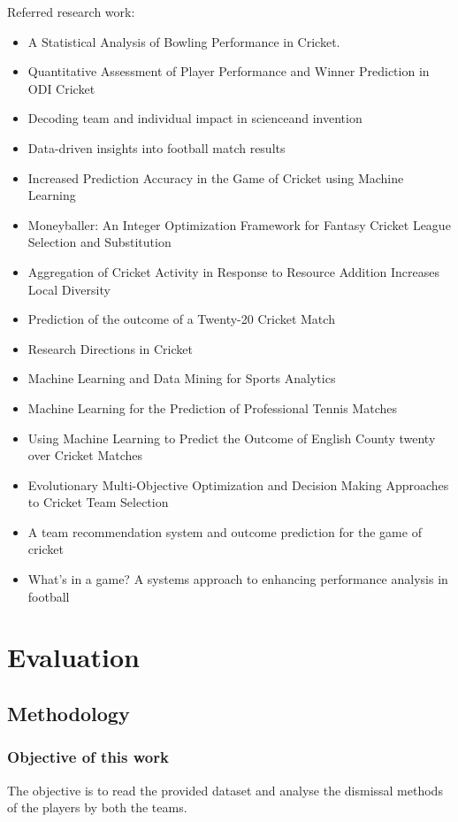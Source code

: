 \documentclass[fleqn,10pt]{wlscirep}
\begin{document}
Referred research work:
\begin{itemize}
    \item A Statistical Analysis of Bowling Performance in Cricket.
    \item Quantitative Assessment of Player Performance and Winner Prediction
    in ODI Cricket
    \item Decoding team and individual impact in scienceand invention
    \item Data-driven insights into football match results
    \item Increased Prediction Accuracy in the Game of Cricket using Machine Learning
    \item Moneyballer: An Integer Optimization Framework for Fantasy Cricket League Selection and Substitution
    \item Aggregation of Cricket Activity in Response to Resource Addition Increases Local Diversity
    \item Prediction of the outcome of a Twenty-20 Cricket Match
    \item Research Directions in Cricket
    \item Machine Learning and Data Mining for Sports Analytics
    \item Machine Learning for the Prediction of Professional Tennis Matches
    \item Using Machine Learning to Predict the Outcome of English County twenty over Cricket Matches
    \item Evolutionary Multi-Objective Optimization and Decision Making Approaches to Cricket Team Selection
    \item A team recommendation system and outcome prediction for the game of cricket
    \item What’s in a game? A systems approach to enhancing performance analysis in football
\end{itemize}

\section{Evaluation}
\subsection{Methodology}
\subsubsection{Objective of this work}
The objective is to read the provided dataset and analyse the dismissal methods of the players by both the teams.
\end{document}
